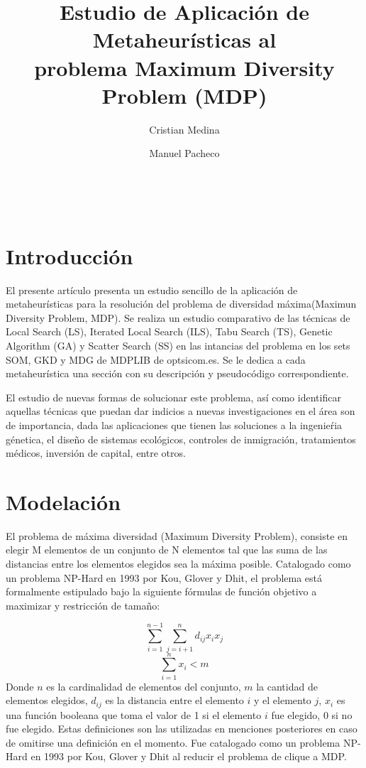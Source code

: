 \documentclass{ci5652}
\title{Estudio de Aplicación de Metaheurísticas al \\ problema Maximum Diversity Problem (MDP)}
\author{Cristian Medina
        \and
        Manuel Pacheco}
\begin{document}
\thispagestyle{empty}
\maketitle
\

\section{Introducción}
El presente artículo presenta un estudio sencillo de la aplicación de metaheurísticas para la resolución del problema de diversidad máxima(Maximun Diversity Problem, MDP). Se realiza un estudio comparativo de las técnicas de Local Search (LS), Iterated Local Search (ILS), Tabu Search (TS), Genetic Algorithm (GA) y Scatter Search (SS) en las intancias del problema en los sets SOM, GKD y MDG de MDPLIB de optsicom.es. Se le dedica a cada metaheurística una sección con su descripción y pseudocódigo correspondiente.

El estudio de nuevas formas de solucionar este problema, así como identificar aquellas técnicas que puedan dar indicios a nuevas investigaciones en el área son de importancia, dada las aplicaciones que tienen las soluciones a la ingenieŕia génetica, el diseño de sistemas ecológicos, controles de inmigración, tratamientos médicos, inversión de capital, entre otros. 

\section{Modelación}
El problema de máxima diversidad (Maximum Diversity Problem), consiste en elegir M elementos de un conjunto de N elementos tal que las suma de las distancias entre los elementos elegidos sea la máxima posible. Catalogado como un problema NP-Hard en 1993 por Kou, Glover y Dhit, el problema está formalmente estipulado bajo la siguiente fórmulas de función objetivo a maximizar y restricción de tamaño:

$$\sum_{i=1}^{n-1} \sum_{j=i+1}^n d_{ij}x_ix_j$$
$$\sum_{i=1}^{n}x_i<m$$ 
Donde $n$ es la cardinalidad de elementos del conjunto, $m$ la cantidad de elementos elegidos, $d_{ij}$ es la distancia entre el elemento $i$ y el elemento $j$, $x_i$ es una función booleana que toma el valor de 1 si el elemento $i$ fue elegido, 0 si no fue elegido. Estas definiciones son las utilizadas en menciones posteriores en caso de omitirse una definición en el momento. Fue catalogado como un problema NP-Hard en 1993 por Kou, Glover y Dhit al reducir el problema de clique a MDP.
\end{document}
